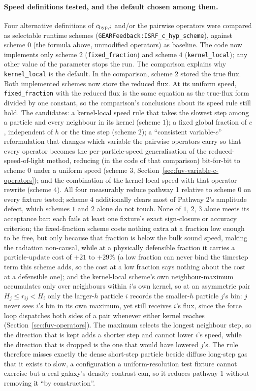 \paragraph{Speed definitions tested, and the default chosen among them.}
Four alternative definitions of $c_{{\rm hyp},i}$ and/or the pairwise
operators were compared as selectable runtime schemes
(\texttt{GEARFeedback:ISRF\_c\_hyp\_scheme}), against scheme $0$
(the formula above, unmodified operators) as baseline. The code now implements
only scheme $2$ (\texttt{fixed\_fraction}) and scheme $4$
(\texttt{kernel\_local}); any other value of the parameter stops the run. The
comparison explains why \texttt{kernel\_local} is the default. In the
comparison, scheme $2$ stored the true flux. Both implemented schemes now
store the reduced flux. At its uniform speed, \texttt{fixed\_fraction} with
the reduced flux is the same equation as the true-flux form divided by one
constant, so the comparison's conclusions about its speed rule still hold. The
candidates: a kernel-local speed
rule that takes the slowest step among a particle and every neighbour in
its kernel (scheme $1$); a fixed global fraction of $c$, independent of
$h$ or the time step (scheme $2$); a ``consistent variable-$c$''
reformulation that changes which variable the pairwise operators carry so
that every operator becomes the per-particle-speed generalisation of the
reduced-speed-of-light method, reducing (in the code of that comparison) bit-for-bit to scheme $0$
under a uniform speed (scheme $3$,
Section~\ref{sec:fuv-variable-c-operators}); and the combination of the
kernel-local speed with that operator rewrite (scheme $4$). All four
measurably reduce pathway 1 relative to scheme $0$ on every fixture tested;
scheme $4$ additionally clears most of Pathway 2's amplitude defect,
which schemes $1$ and $2$ alone do not touch. None of $1$, $2$, $3$ alone
meets its acceptance bar: each fails at least one
fixture's exact sign-closure or accuracy criterion; the fixed-fraction
scheme costs nothing extra at a fraction low enough to be free, but only
because that fraction is below the bulk sound speed, making the
radiation non-causal, while at a physically defensible fraction it carries a
particle-update cost of $+21$ to $+29\%$ (a low fraction can never bind
the timestep term this scheme adds, so the cost at a low fraction says
nothing about the cost at a defensible one); and the
kernel-local scheme's own neighbour-maximum accumulates only over
neighbours within $i$'s own kernel, so at an asymmetric pair
$H_j \le r_{ij} < H_i$ only the larger-$h$ particle $i$ records the
smaller-$h$ particle $j$'s bin: $j$ never sees $i$'s bin in its own
maximum, yet still receives $i$'s flux, since the force loop dispatches
both sides of a pair whenever either kernel reaches
(Section~\ref{sec:fuv-operators}). The maximum selects the longest
neighbour step, so the direction that is kept adds a shorter step and
cannot lower $i$'s speed, while the direction that is dropped is the one
that would have lowered $j$'s. The rule therefore misses exactly the
dense short-step particle beside diffuse long-step gas that it exists to
slow, a configuration a uniform-resolution test fixture cannot exercise
but a real galaxy's density contrast can, so it reduces pathway 1
without removing it ``by construction''.

